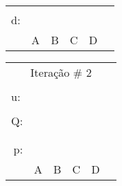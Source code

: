 \documentclass[16pt]{examdesign}
\begin{document}
\begin{fillin}[title={},
                    rearrange=no,resetcounter=no,suppressprefix]
\begin{question}
\begin{multicols}{4}
\begin{tabular}{|llllll|}
					    &                       &                       &                       &                       &  \\ \cline{2-5}
  \multicolumn{1}{|l|}{\multirow{2}{*}{d:}} & \multicolumn{1}{l|}{} & \multicolumn{1}{l|}{} & \multicolumn{1}{l|}{} & \multicolumn{1}{l|}{} &  \\
  \multicolumn{1}{|l|}{}                    & \multicolumn{1}{l|}{} & \multicolumn{1}{l|}{} & \multicolumn{1}{l|}{} & \multicolumn{1}{l|}{} &  \\ \cline{2-5}
					    & A                     & B                     & C                     & D                     &  \\ \hline
  \end{tabular}
  \begin{tabular}{|llllll|}
  \hline
  \multicolumn{6}{|c|}{Iteração \# 2}                                                                                                          \\
					    &                       &                       &                       &                       &  \\
  u:                                        &                       &                       &                       &                       &  \\ \cline{2-3}
					    &                       &                       &                       &                       &  \\ \cline{2-5}
  \multicolumn{1}{|r|}{Q:}                  & \multicolumn{1}{l|}{} & \multicolumn{1}{l|}{} & \multicolumn{1}{l|}{} & \multicolumn{1}{l|}{} &  \\
  \multicolumn{1}{|l|}{}                    & \multicolumn{1}{l|}{} & \multicolumn{1}{l|}{} & \multicolumn{1}{l|}{} & \multicolumn{1}{l|}{} &  \\ \cline{2-5}
					    &                       &                       &                       &                       &  \\ \cline{2-5}
  \multicolumn{1}{|r|}{\multirow{2}{*}{p:}} & \multicolumn{1}{l|}{} & \multicolumn{1}{l|}{} & \multicolumn{1}{l|}{} & \multicolumn{1}{l|}{} &  \\
  \multicolumn{1}{|r|}{}                    & \multicolumn{1}{l|}{} & \multicolumn{1}{l|}{} & \multicolumn{1}{l|}{} & \multicolumn{1}{l|}{} &  \\ \cline{2-5}
					    & A                     & B                     & C                     & D                     &  \\

\end{tabular}
\end{multicols}
\end{question}
\end{fillin}
\end{document}
